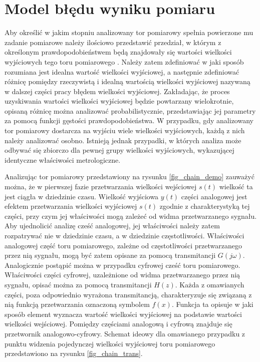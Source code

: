 \chapter{Model błędu wyniku pomiaru}

Aby określić w jakim stopniu analizowany tor pomiarowy spełnia powierzone mu zadanie pomiarowe należy ilościowo przedstawić przedział, w którym z określonym prawdopodobieństwem będą znajdowały się wartości wielkości wyjściowych tego toru pomiarowego \cite{jcgm_guide}. Należy zatem zdefiniować w jaki sposób rozumiana jest idealna wartość wielkości wyjściowej, a następnie zdefiniować różnicę pomiędzy rzeczywistą i idealną wartością wielkości wyjściowej nazywaną w dalszej części pracy błędem wielkości wyjściowej. Zakładając, że proces uzyskiwania wartości wielkości wyjściowej będzie powtarzany wielokrotnie, opisaną różnicę można analizować probabilistycznie, przedstawiając jej parametry za pomocą funkcji gęstości prawdopodobieństwa. W przypadku, gdy analizowany tor pomiarowy dostarcza na wyjściu wiele wielkości wyjściowych, każdą z nich należy analizować osobno. Istnieją jednak przypadki, w których analiza może odbywać się zbiorczo dla pewnej grupy wielkości wyjściowych, wykazującej identyczne właściwości metrologiczne.

Analizując tor pomiarowy przedstawiony na rysunku \ref{fig_chain_demo} zauważyć można, że w pierwszej fazie przetwarzania wielkości wejściowej $s(t)$ wielkość ta jest ciągła w dziedzinie czasu. Wielkość wyjściowa $y(t)$ części analogowej jest efektem przetwarzania wielkości wyjściowej $s(t)$ zgodnie z charakterystyką tej części, przy czym jej właściwości mogą zależeć od widma przetwarzanego sygnału. Aby ujednolicić analizę cześć analogowej, jej właściwości należy zatem rozpatrywać nie w dziedzinie czasu, a w dziedzinie częstotliwości. Właściwości analogowej część toru pomiarowego, zależne od częstotliwości przetwarzanego przez nią sygnału, mogą być zatem opisane za pomocą transmitancji $G(j\omega)$. Analogicznie postąpić można w przypadku cyfrowej cześć toru pomiarowego. Właściwości części cyfrowej, uzależnione od widma przetwarzanego przez nią sygnału, opisać można za pomocą transmitancji $H(z)$. Każda z omawianych części, poza odpowiednio wyrażona transmitancją, charakteryzuje się związaną z nią funkcją przetwarzania oznaczoną symbolem $f(x)$. Funkcja ta opisuje w jaki sposób element wyznacza wartość wielkości wyjściowej na podstawie wartości wielkości wejściowej. Pomiędzy częściami analogową i cyfrową znajduje się przetwornik analogowo-cyfrowy. Schemat ideowy dla omawianego przypadku z punktu widzenia pojedynczej wielkości wyjściowej toru pomiarowego przedstawiono na rysunku \ref{fig_chain_trans}.


